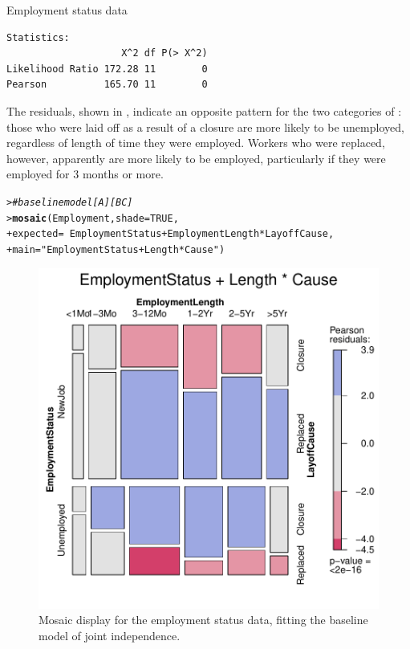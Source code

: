 \documentclass[10pt,krantz2]{krantz}\usepackage[]{graphicx}\usepackage[]{color}
\makeatletter
\newcommand{\hlnum}[1]{\textcolor[rgb]{0.686,0.059,0.569}{#1}}%
\newcommand{\hlstr}[1]{\textcolor[rgb]{0.192,0.494,0.8}{#1}}%
\newcommand{\hlcom}[1]{\textcolor[rgb]{0.678,0.584,0.686}{\textit{#1}}}%
\newcommand{\hlopt}[1]{\textcolor[rgb]{0,0,0}{#1}}%
\newcommand{\hlstd}[1]{\textcolor[rgb]{0.345,0.345,0.345}{#1}}%
\newcommand{\hlkwc}[1]{\textcolor[rgb]{0.333,0.667,0.333}{#1}}%
\newcommand{\hlkwd}[1]{\textcolor[rgb]{0.737,0.353,0.396}{\textbf{#1}}}%
\newenvironment{kframe}{%
 \def\at@end@of@kframe{}%
 \ifinner\ifhmode%
  \def\at@end@of@kframe{\end{minipage}}%
  \begin{minipage}{\columnwidth}%
 \fi\fi%
 \def\FrameCommand##1{\hskip\@totalleftmargin \hskip-\fboxsep
 \colorbox{shadecolor}{##1}\hskip-\fboxsep
     \hskip-\linewidth \hskip-\@totalleftmargin \hskip\columnwidth}%
 \MakeFramed {\advance\hsize-\width
   \@totalleftmargin\z@ \linewidth\hsize
   \@setminipage}}%
 {\par\unskip\endMakeFramed%
 \at@end@of@kframe}
\newenvironment{knitrout}{}{} %
\renewenvironment{knitrout}{\small\renewcommand{\baselinestretch}{.85}}{} %
\makeatother
\begin{document}
\begin{Example}[employ]{Employment status data}
\begin{knitrout}
\begin{kframe}
\begin{verbatim}
Statistics:
                    X^2 df P(> X^2)
Likelihood Ratio 172.28 11        0
Pearson          165.70 11        0
\end{verbatim}
\end{kframe}
\end{knitrout}

The residuals, shown in ,
indicate an opposite pattern for the two categories of :
those who were laid off as a result of a closure
are more likely to be unemployed, regardless of length of time
they were employed.
Workers who were replaced, however, apparently are more likely
to be employed, particularly if they were employed for 3 months or more.

\begin{knitrout}
\color{fgcolor}\begin{kframe}
\begin{alltt}
\hlstd{> }\hlcom{# baseline model [A][BC]}
\hlstd{> }\hlkwd{mosaic}\hlstd{(Employment,} \hlkwc{shade} \hlstd{=} \hlnum{TRUE}\hlstd{,}
\hlstd{+ }       \hlkwc{expected} \hlstd{=} \hlopt{~} \hlstd{EmploymentStatus} \hlopt{+} \hlstd{EmploymentLength} \hlopt{*} \hlstd{LayoffCause,}
\hlstd{+ }       \hlkwc{main} \hlstd{=} \hlstr{"EmploymentStatus + Length * Cause"}\hlstd{)}
\end{alltt}
\end{kframe}\begin{figure}[!htbp]

\centerline{\includegraphics[width=.6\textwidth]{ch05/fig/employ-mos1-1} }

\caption[Mosaic display for the employment status data, fitting the baseline model of joint independence]{Mosaic display for the employment status data, fitting the baseline model of joint independence.\label{fig:employ-mos1}}
\end{figure}



\end{knitrout}
\end{Example}
\end{document}
